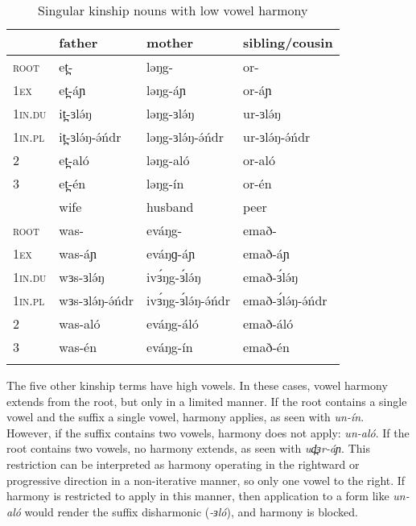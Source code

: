\begin{table}	
\caption{Singular kinship nouns with low vowel harmony}\label{tab:ch6:lowvowkin}
\begin{tabular}[t]{llll}
\lsptoprule
		& father 	& mother 		&	sibling/cousin	\\
	\midrule
\textsc{root}	& et̪-		&ləŋg-			&or- \\
\textsc{1ex }		&et̪-áɲ		&ləŋg-áɲ		&or-áɲ		 \\
\textsc{1in.du}	&it̪-ɜlə́ŋ	&ləŋg-ɜlə́ŋ		&ur-ɜlə́ŋ \\
\textsc{1in.pl}	&it̪-ɜlə́ŋ-ə́ńdr&	ləŋg-ɜlə́ŋ-ə́ńdr&	ur-ɜlə́ŋ-ə́ńdr\\
2		&et̪-aló		&	ləŋg-aló	&or-aló\\
3		&et̪-én		&ləŋg-ín		&or-én\\
	\midrule
	&	wife	&	husband &	peer \\
	\midrule
\textsc{root}	&	was-		&	eváŋg-		& emað-	\\	 
\textsc{1ex	}	&	was-áɲ		&	eváŋɡ-áɲ	& emað-áɲ\\
\textsc{1in.du}	& wɜs-ɜlə́ŋ		&	ivɜ́ŋg-ɜ́lə́ŋ	 & emað-ɜ́lə́ŋ\\
\textsc{1in.pl}	& wɜs-ɜlə́ŋ-ə́ńdr	&	ivɜ́ŋg-ɜ́lə́ŋ-ə́ńdr	 & emað-ɜ́lə́ŋ-ə́ńdr	\\
2		&	was-aló		&	eváŋg-áló	 & emað-áló\\
3		&	was-én		&	eváŋg-ín	 & emað-én\\
	\lspbottomrule
\end{tabular}	
\end{table}

The five other kinship terms have high vowels. In these cases, vowel harmony extends from the root, but only in a limited manner. If the root contains a single vowel and the suffix a single vowel, harmony applies, as seen with \textit{un-ín}. However, if the suffix contains two vowels, harmony does not apply: \textit{un-aló}. If the root contains two vowels, no harmony extends, as seen with \textit{ud̪ɜr-áɲ}. This restriction can be interpreted as harmony operating in the rightward or progressive direction in a non-iterative manner, so only one vowel to the right. If harmony is restricted to apply in this manner, then application to a form like \textit{un-aló} would render the suffix disharmonic (\textit{-ɜló}), and harmony is blocked. 

